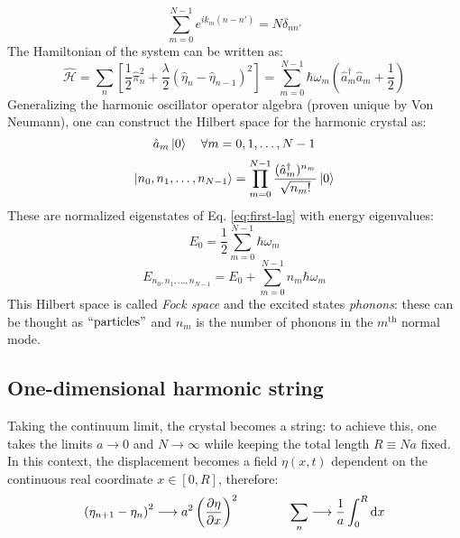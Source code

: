 \begin{equation}
  \sum_{m = 0}^{N - 1} e^{i k_m \left( n - n' \right)} = N \delta_{n n'}
  \label{eq:first-id}
\end{equation}
The Hamiltonian of the system can be written as:
\begin{equation}
  \hat{\mathcal{H}} = \sum_{n} \left[ \frac{1}{2} \hat{\pi}_n^2 + \frac{\lambda}{2} \left( \hat{\eta}_n - \hat{\eta}_{n-1} \right)^2 \right] = \sum_{m = 0}^{N - 1} \hbar \omega_m \left( \hat{a}_m^\dagger \hat{a}_m + \frac{1}{2} \right)
\end{equation}
Generalizing the harmonic oscillator operator algebra (proven unique by Von Neumann), one can construct the Hilbert space for the harmonic crystal as:
\begin{equation}
  \hat{a}_m \ket{0} \quad \forall m = 0, 1, \dots, N - 1
\end{equation}
\begin{equation}
  \ket{n_0, n_1, \dots, n_{N-1}} = \prod_{m = 0}^{N - 1} \frac{( \hat{a}_m^\dagger )^{n_m}}{\sqrt{n_m!}} \ket{0}
\end{equation}
These are normalized eigenstates of Eq. \ref{eq:first-lag} with energy eigenvalues:
\begin{equation}
  E_0 = \frac{1}{2} \sum_{m = 0}^{N - 1} \hbar \omega_m
  \label{eq:first-harm}
\end{equation}
\begin{equation}
  E_{n_0, n_1, \dots, n_{N-1}} = E_0 + \sum_{m = 0}^{N - 1} n_m \hbar \omega_m
\end{equation}
This Hilbert space is called \textit{Fock space} and the excited states \textit{phonons}: these can be thought as $ ``\text{particles}" $ and $ n_m $ is the number of phonons in the $ m^{\mathrm{th}} $ normal mode.

\subsection{One-dimensional harmonic string}

Taking the continuum limit, the crystal becomes a string: to achieve this, one takes the limits $ a \rightarrow 0 $ and $ N \rightarrow \infty $ while keeping the total length $ R \equiv N a $ fixed. In this context, the displacement becomes a field $ \eta(x,t) $ dependent on the continuous real coordinate $ x \in [0, R] $, therefore:
\begin{equation*}
  \left( \eta_{n + 1} - \eta_n \right)^2 \longrightarrow a^2 \left( \frac{\partial \eta}{\partial x} \right)^2
  \qquad \qquad
  \sum_{n} \longrightarrow \frac{1}{a} \int_0^R \mathrm{d} x
\end{equation*}

